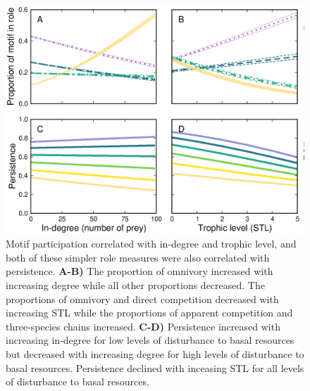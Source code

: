 \documentclass[12pt]{article}
\begin{document}
\begin{spacing}{2.0}
    \begin{figure}[hb!]
        \centering
        \includegraphics[width=\textwidth]{figures/roles_vs_TL.eps}
        \caption{Motif participation correlated with in-degree and trophic level, and both of these simpler role measures were also correlated with persistence. \textbf{A-B)} The proportion of omnivory increased with increasing degree while all other proportions decreased. The proportions of omnivory and direct competition decreased with increasing STL while the proportions of apparent competition and three-species chains increased. \textbf{C-D)} Persistence increased with increasing in-degree for low levels of disturbance to basal resources but decreased with increasing degree for high levels of disturbance to basal resources.
        Persistence declined with inceasing STL for all levels of disturbance to basal resources.}
        \label{fig:motifs_vs_TL_and_deg}
    \end{figure}        


\end{spacing}
\end{document}

